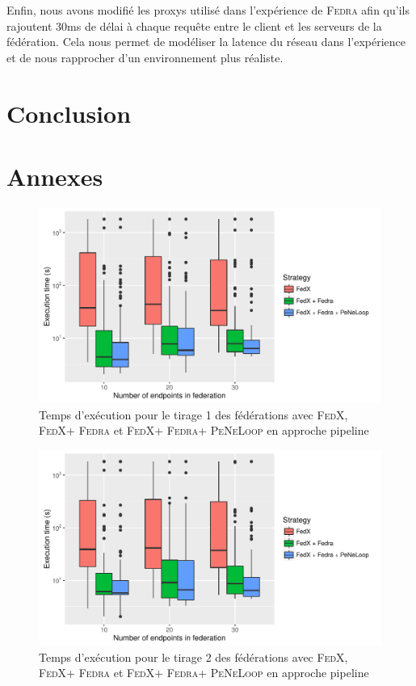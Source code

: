 \documentclass[a4paper]{article}
\def\fedra{\textsc{Fedra}\xspace}
\def\fedx{\textsc{FedX}\xspace}
\def\peneloop{\textsc{PeNeLoop}\xspace}
\begin{document}
Enfin, nous avons modifié les proxys utilisé dans l'expérience de \fedra afin qu'ils rajoutent 30ms de délai à chaque requête entre le client et les serveurs de la fédération. Cela nous permet de modéliser la latence du réseau dans l'expérience et de nous rapprocher d'un environnement plus réaliste.

\section{Conclusion}




\section{Annexes}

\begin{figure}[h]
    \centering
    \includegraphics{boxplots/fed1_execution_time.pdf}
    \caption{Temps d'exécution pour le tirage 1 des fédérations avec \fedx, \fedx + \fedra et \fedx + \fedra + \peneloop en approche pipeline}
    \label{fig:fed1_time}
\end{figure}

\begin{figure}[h]
    \centering
    \includegraphics{boxplots/fed2_execution_time.pdf}
    \caption{Temps d'exécution pour le tirage 2 des fédérations avec \fedx, \fedx + \fedra et \fedx + \fedra + \peneloop en approche pipeline}
    \label{fig:fed2_time}
\end{figure}
\end{document}
